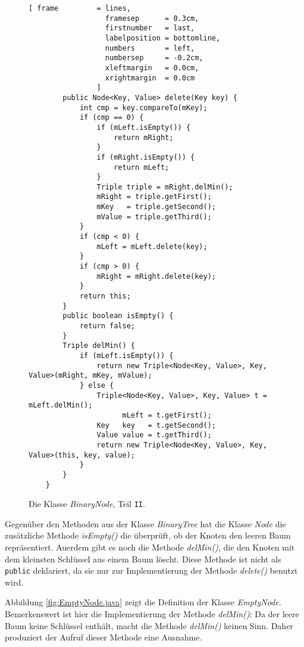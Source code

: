 \begin{figure}[!ht]
  \centering
\begin{Verbatim}[ frame         = lines, 
                  framesep      = 0.3cm, 
                  firstnumber   = last,
                  labelposition = bottomline,
                  numbers       = left,
                  numbersep     = -0.2cm,
                  xleftmargin   = 0.0cm,
                  xrightmargin  = 0.0cm
                ]
        public Node<Key, Value> delete(Key key) {
            int cmp = key.compareTo(mKey);
            if (cmp == 0) {
                if (mLeft.isEmpty()) {
                    return mRight;
                } 
                if (mRight.isEmpty()) {
                    return mLeft;
                }
                Triple triple = mRight.delMin();
                mRight = triple.getFirst();
                mKey   = triple.getSecond();
                mValue = triple.getThird();
            }
            if (cmp < 0) {
                mLeft = mLeft.delete(key);
            }
            if (cmp > 0) {
                mRight = mRight.delete(key);
            }
            return this;
        }    
        public boolean isEmpty() {
            return false;
        }
        Triple delMin() {
            if (mLeft.isEmpty()) {
                return new Triple<Node<Key, Value>, Key, Value>(mRight, mKey, mValue);
            } else {
                Triple<Node<Key, Value>, Key, Value> t = mLeft.delMin();
                      mLeft = t.getFirst();
                Key   key   = t.getSecond();
                Value value = t.getThird();
                return new Triple<Node<Key, Value>, Key, Value>(this, key, value);
            }
        }        
    }
\end{Verbatim}
\vspace*{-0.3cm}
  \caption{Die Klasse \textsl{BinaryNode}, Teil \texttt{II}.}
  \label{fig:BinaryNode-II.java}
\end{figure}
\vspace*{0.1cm}

Gegen\"uber den Methoden aus der Klasse \textsl{BinaryTree} hat die Klasse \textsl{Node} die
zus\"atzliche Methode \textsl{isEmpty()} die \"uberpr\"uft, ob der Knoten den leeren Baum
repr\"asentiert. Au\3erdem gibt es noch die Methode \textsl{delMin()}, die den Knoten mit dem
kleinsten Schl\"ussel aus einem Baum l\"oscht.  Diese Methode ist nicht als \texttt{public}
deklariert, da sie nur zur Implementierung der Methode \textsl{delete()} benutzt wird.


Abbildung \ref{fig:EmptyNode.java} zeigt die Definition der Klasse \textsl{EmptyNode}.
Bemerkenswert ist hier die Implementierung der Methode \textsl{delMin()}: Da der leere
Baum keine Schl\"ussel enth\"alt, macht die Methode \textsl{delMin()} keinen Sinn.  Daher
produziert der Aufruf dieser Methode eine Ausnahme.


